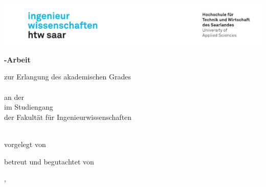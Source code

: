 \begin{titlepage}\linespread{1.5}\selectfont
\includegraphics[width=\linewidth]{Graphics/htwsaar_Logo_inwi_head_VF_4C_crop}
  \begin{center}
    \large  
    \hfill
    \vfill
    \begingroup
      \Large\bfseries\myDegreeType-Arbeit 
    \endgroup
		
		\bigskip
		
    zur Erlangung des akademischen Grades \\
    \myDegree \\ 
    an der \myUni \\
    im Studiengang \myDegreeCourse \\
    der Fakultät für Ingenieurwissenschaften \\ 
    
  \vfill
	
  \begingroup
    \Large\bfseries\myTitle 
  \endgroup
	
	\bigskip
	
  vorgelegt von \\
  \myName
	
  \vfill
	
  betreut und begutachtet von \\
  \myFirstProf
	
  \vfill
	
  \myLocation, \myTime                   

    \end{center}       
\end{titlepage}   